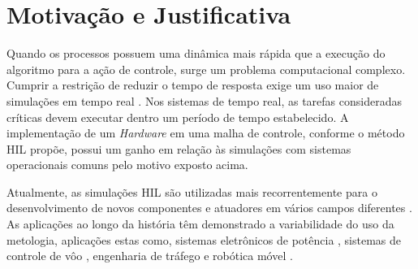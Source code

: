 \section{Motivação e Justificativa}

Quando os processos possuem uma dinâmica mais rápida que a execução do algoritmo para a ação 
de controle, surge um problema computacional complexo. Cumprir a restrição de reduzir o tempo
de resposta exige um uso maior de simulações em tempo real \cite{Isermann}. Nos sistemas de 
tempo real, as tarefas consideradas críticas devem executar dentro um período de tempo 
estabelecido. A implementação de um \textit{Hardware} em uma malha de controle, conforme o 
método HIL propõe, possui um ganho em relação às simulações com 
sistemas operacionais comuns pelo motivo exposto acima.

Atualmente, as simulações HIL são utilizadas mais recorrentemente
para o desenvolvimento de novos componentes e atuadores em vários campos
diferentes \cite{Bouscayrol}. As aplicações ao longo da história têm demonstrado a 
variabilidade do uso da metologia, aplicações estas como, sistemas eletrônicos de 
potência \cite{Rothstein}, sistemas de controle de vôo \cite{Karpenko}, engenharia 
de tráfego \cite{Bullock} e robótica móvel \cite{Kamali}.




